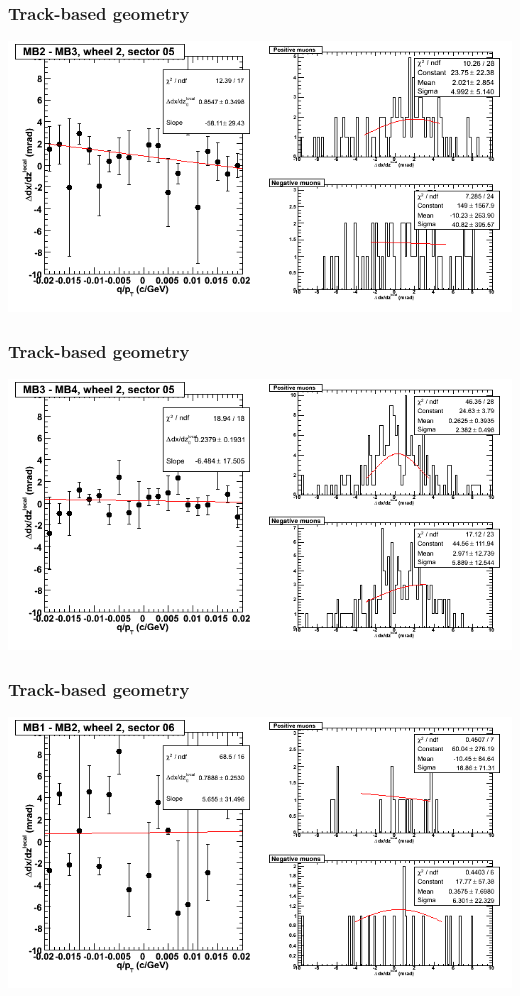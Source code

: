 \documentclass[compress]{beamer}
\begin{document}
\begin{frame}
\frametitle{Track-based geometry}
\includegraphics[width=\linewidth]{NOV4_segdiffs/dt13_slope_E_05_23.png}
\end{frame}

\begin{frame}
\frametitle{Track-based geometry}
\includegraphics[width=\linewidth]{NOV4_segdiffs/dt13_slope_E_05_34.png}
\end{frame}

\begin{frame}
\frametitle{Track-based geometry}
\includegraphics[width=\linewidth]{NOV4_segdiffs/dt13_slope_E_06_12.png}
\end{frame}
\end{document}
